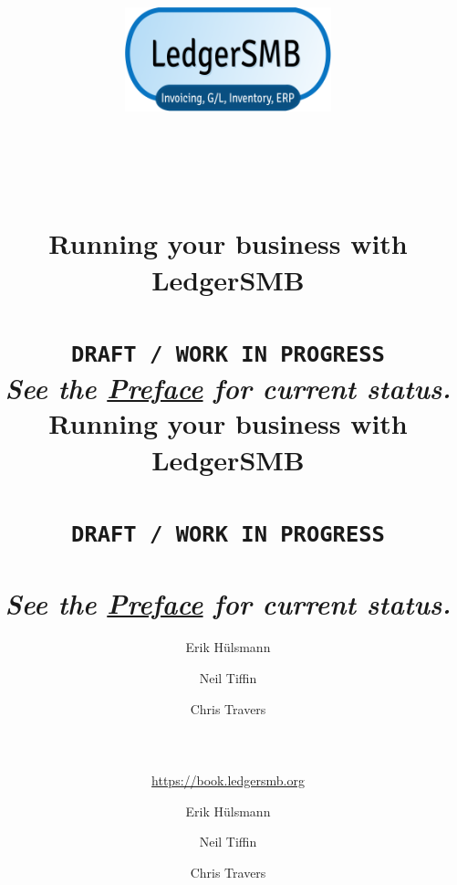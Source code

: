 
\ifpdf
  \usepackage{metalogo}
\fi




\ifpdf
    \author{Erik H\"ulsmann \and Neil Tiffin \and Chris Travers \\
    ~ \\
    ~ \\
    ~ \\
     \url{https://book.ledgersmb.org}
    } 
    
    \title{
        \includegraphics[width=0.45\textwidth]{NewLedgerSMBLogo512x256.png}\\
        ~ \\
        ~ \\
        ~ \\
        Running your business with\\
        {\Huge LedgerSMB \ledgerSMBversion} \\
        ~ \\
        \texttt{DRAFT / WORK IN PROGRESS} \\
        \normalsize{\emph{See the \hyperref[preface]{Preface}  for current status.}}\\
    }
    \maketitle

\else

    \author{Erik H\"ulsmann \and Neil Tiffin \and Chris Travers}
    \title{
        Running your business with
        LedgerSMB \ledgerSMBversion \\
        ~ \\
        \texttt{DRAFT / WORK IN PROGRESS} \\
        ~ \\
        \footnotesize{\emph{See the \hyperref[preface]{Preface}  for current status.}}\\
    }

